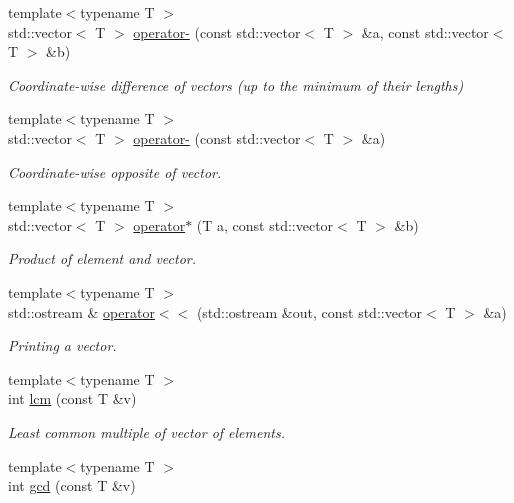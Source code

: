 \begin{DoxyCompactItemize}
{\footnotesize template$<$typename T $>$ }\\std\+::vector$<$ T $>$ \hyperlink{namespaceMackey_ae86e49097ef9a09ebcd0173881e88786}{operator-\/} (const std\+::vector$<$ T $>$ \&a, const std\+::vector$<$ T $>$ \&b)
\begin{DoxyCompactList}\small\item\em Coordinate-\/wise difference of vectors (up to the minimum of their lengths) \end{DoxyCompactList}\item 
{\footnotesize template$<$typename T $>$ }\\std\+::vector$<$ T $>$ \hyperlink{namespaceMackey_a9d67cfe3e93ac3ef2301547372b48e15}{operator-\/} (const std\+::vector$<$ T $>$ \&a)
\begin{DoxyCompactList}\small\item\em Coordinate-\/wise opposite of vector. \end{DoxyCompactList}\item 
{\footnotesize template$<$typename T $>$ }\\std\+::vector$<$ T $>$ \hyperlink{namespaceMackey_ae235ee5dd92dc1ca64388b8fbb1b4d75}{operator$\ast$} (T a, const std\+::vector$<$ T $>$ \&b)
\begin{DoxyCompactList}\small\item\em Product of element and vector. \end{DoxyCompactList}\item 
{\footnotesize template$<$typename T $>$ }\\std\+::ostream \& \hyperlink{namespaceMackey_aa4da3e3b46b9cb20f3be57d7e5da2d5d}{operator$<$$<$} (std\+::ostream \&out, const std\+::vector$<$ T $>$ \&a)
\begin{DoxyCompactList}\small\item\em Printing a vector. \end{DoxyCompactList}\item 
{\footnotesize template$<$typename T $>$ }\\int \hyperlink{namespaceMackey_a5d8ae76ffb9440e27bfca124d26ee1b2}{lcm} (const T \&v)
\begin{DoxyCompactList}\small\item\em Least common multiple of vector of elements. \end{DoxyCompactList}\item 
{\footnotesize template$<$typename T $>$ }\\int \hyperlink{namespaceMackey_a9c9c2faea24be988cdfcd773360134be}{gcd} (const T \&v)

\end{DoxyCompactItemize}
